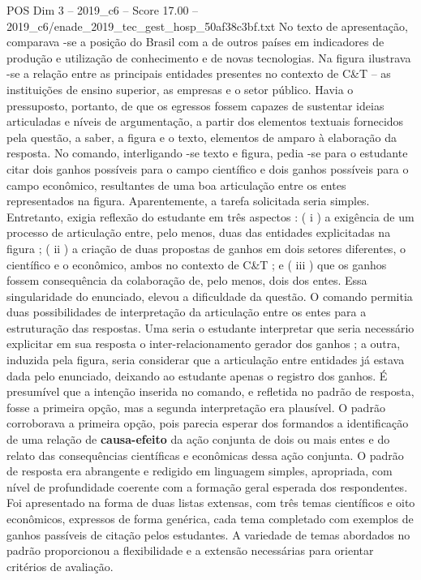 \begin{textsample}{POS Dim 3 – 2019\_c6 – Score 17.00 – 2019\_c6/enade\_2019\_tec\_gest\_hosp\_50af38c3bf.txt}
No texto de apresentação, comparava -se a posição do Brasil com a de outros países em indicadores de produção e utilização de conhecimento e de novas tecnologias.
Na figura ilustrava -se a relação entre as principais entidades presentes no contexto de C\&T – as instituições de ensino superior, as empresas e o setor público.
Havia o pressuposto, portanto, de que os egressos fossem capazes de sustentar ideias articuladas e níveis de argumentação, a partir dos elementos textuais fornecidos pela questão, a saber, a figura e o texto, elementos de amparo à elaboração da resposta.
No comando, interligando -se texto e figura, pedia -se para o estudante citar dois ganhos possíveis para o campo científico e dois ganhos possíveis para o campo econômico, resultantes de uma boa articulação entre os entes representados na figura.
Aparentemente, a tarefa solicitada seria simples.
Entretanto, exigia reflexão do estudante em três aspectos : ( i ) a exigência de um processo de articulação entre, pelo menos, duas das entidades explicitadas na figura ; ( ii ) a criação de duas propostas de ganhos em dois setores diferentes, o científico e o econômico, ambos no contexto de C\&T ; e ( iii ) que os ganhos fossem consequência da colaboração de, pelo menos, dois dos entes.
Essa singularidade do enunciado, elevou a dificuldade da questão.
O comando permitia duas possibilidades de interpretação da articulação entre os entes para a estruturação das respostas.
Uma seria o estudante interpretar que seria necessário explicitar em sua resposta o inter-relacionamento gerador dos ganhos ; a outra, induzida pela figura, seria considerar que a articulação entre entidades já estava dada pelo enunciado, deixando ao estudante apenas o registro dos ganhos.
É presumível que a intenção inserida no comando, e refletida no padrão de resposta, fosse a primeira opção, mas a segunda interpretação era plausível.
O padrão corroborava a primeira opção, pois parecia esperar dos formandos a identificação de uma relação de \textbf{causa-efeito} da ação conjunta de dois ou mais entes e do relato das consequências científicas e econômicas dessa ação conjunta.
O padrão de resposta era abrangente e redigido em linguagem simples, apropriada, com nível de profundidade coerente com a formação geral esperada dos respondentes.
Foi apresentado na forma de duas listas extensas, com três temas científicos e oito econômicos, expressos de forma genérica, cada tema completado com exemplos de ganhos passíveis de citação pelos estudantes.
A variedade de temas abordados no padrão proporcionou a flexibilidade e a extensão necessárias para orientar critérios de avaliação.

\end{textsample}
